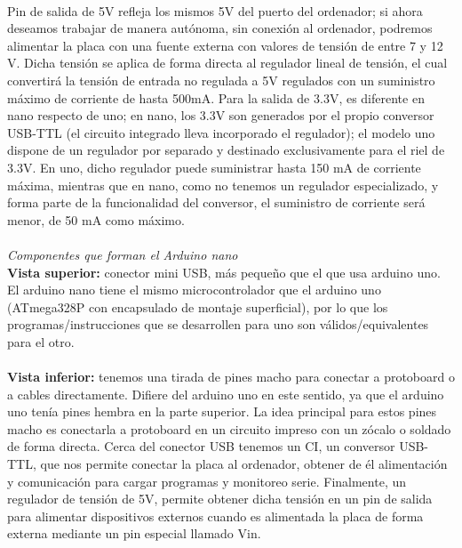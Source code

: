 \documentclass[12pt]{article}
\begin{document}
	 \\
	
	\noindent Pin de salida de 5V refleja los mismos 5V del puerto  del ordenador; si ahora deseamos trabajar de manera autónoma, sin conexión al ordenador, podremos alimentar la placa con una fuente externa con valores de tensión de entre 7 y 12 V. Dicha tensión se aplica de forma directa al regulador lineal de tensión, el cual convertirá la tensión de entrada no regulada a 5V regulados con un suministro máximo de corriente de hasta 500mA. Para la salida de 3.3V, es diferente en nano respecto de uno; en nano, los 3.3V son generados por el propio conversor USB-TTL (el circuito integrado lleva incorporado el regulador); el modelo uno dispone de un regulador por separado y destinado exclusivamente para el riel de 3.3V. En uno, dicho regulador puede suministrar hasta 150 mA de corriente máxima, mientras que en nano, como no tenemos un regulador especializado, y forma parte de la funcionalidad del conversor, el suministro de corriente será menor, de 50 mA como máximo. \\
	
	 \\
	
	\noindent \textit{Componentes que forman el Arduino nano} \\
	
	\noindent \textbf{Vista superior:} conector mini USB, más pequeño que el que usa arduino uno. El arduino nano tiene el mismo microcontrolador que el arduino uno (ATmega328P con encapsulado de montaje superficial), por lo que los programas/instrucciones que se desarrollen para uno son válidos/equivalentes para el otro. \\
	
	 \\
	
	\noindent \textbf{Vista inferior:} tenemos una tirada de pines macho para conectar a protoboard o a cables directamente. Difiere del arduino uno en este sentido, ya que el arduino uno tenía pines hembra en la parte superior. La idea principal para estos pines macho es conectarla a protoboard en un circuito impreso con un zócalo o soldado de forma directa.
	Cerca del conector USB tenemos un CI, un conversor USB-TTL, que nos permite conectar la placa al ordenador, obtener de él alimentación y comunicación para cargar programas y monitoreo serie. Finalmente, un regulador de tensión de 5V, permite obtener dicha tensión en un pin de salida para alimentar dispositivos externos cuando es alimentada la placa de forma externa mediante un pin especial llamado Vin.  \\
\end{document}
